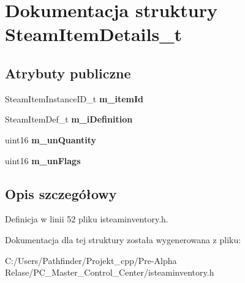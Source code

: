\hypertarget{struct_steam_item_details__t}{}\section{Dokumentacja struktury Steam\+Item\+Details\+\_\+t}
\label{struct_steam_item_details__t}
\subsection*{Atrybuty publiczne}
\begin{DoxyCompactItemize}
\item 
\mbox{\label{struct_steam_item_details__t_a45fb1296c87f566ffc43c860b123e1ed}} 
Steam\+Item\+Instance\+I\+D\+\_\+t {\bfseries m\+\_\+item\+Id}
\item 
\mbox{\label{struct_steam_item_details__t_a844fb5540dab8e45249c5c374d53b73f}} 
Steam\+Item\+Def\+\_\+t {\bfseries m\+\_\+i\+Definition}
\item 
\mbox{\label{struct_steam_item_details__t_afb6f1f45fad84023d7c92fac240b7f44}} 
uint16 {\bfseries m\+\_\+un\+Quantity}
\item 
\mbox{\label{struct_steam_item_details__t_ae68d9a4365000290f8bee79546e80093}} 
uint16 {\bfseries m\+\_\+un\+Flags}
\end{DoxyCompactItemize}


\subsection{Opis szczegółowy}


Definicja w linii 52 pliku isteaminventory.\+h.



Dokumentacja dla tej struktury została wygenerowana z pliku\+:\begin{DoxyCompactItemize}
\item 
C\+:/\+Users/\+Pathfinder/\+Projekt\+\_\+cpp/\+Pre-\/\+Alpha Relase/\+P\+C\+\_\+\+Master\+\_\+\+Control\+\_\+\+Center/isteaminventory.\+h\end{DoxyCompactItemize}
